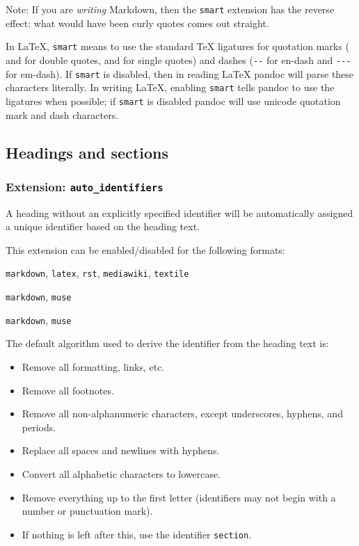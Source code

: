 \documentclass[
]{article}
\providecommand{\tightlist}{%
  \setlength{\itemsep}{0pt}\setlength{\parskip}{0pt}}
\begin{document}
Note: If you are \emph{writing} Markdown, then the \texttt{smart}
extension has the reverse effect: what would have been curly quotes
comes out straight.

In LaTeX, \texttt{smart} means to use the standard TeX ligatures for
quotation marks (\texttt{\textasciigrave{}\textasciigrave{}} and
\texttt{\textquotesingle{}\textquotesingle{}} for double quotes,
\texttt{\textasciigrave{}} and \texttt{\textquotesingle{}} for single
quotes) and dashes (\texttt{-\/-} for en-dash and \texttt{-\/-\/-} for
em-dash). If \texttt{smart} is disabled, then in reading LaTeX pandoc
will parse these characters literally. In writing LaTeX, enabling
\texttt{smart} tells pandoc to use the ligatures when possible; if
\texttt{smart} is disabled pandoc will use unicode quotation mark and
dash characters.

\hypertarget{headings-and-sections}{%
\subsection{Headings and sections}\label{headings-and-sections}}

\hypertarget{extension-auto_identifiers}{%
\subsubsection{\texorpdfstring{Extension:
\texttt{auto\_identifiers}}{Extension: auto\_identifiers}}\label{extension-auto_identifiers}}

A heading without an explicitly specified identifier will be
automatically assigned a unique identifier based on the heading text.

This extension can be enabled/disabled for the following formats:

\begin{description}
\tightlist
\item[input formats]
\texttt{markdown}, \texttt{latex}, \texttt{rst}, \texttt{mediawiki},
\texttt{textile}
\item[output formats]
\texttt{markdown}, \texttt{muse}
\item[enabled by default in]
\texttt{markdown}, \texttt{muse}
\end{description}

The default algorithm used to derive the identifier from the heading
text is:

\begin{itemize}
\tightlist
\item
  Remove all formatting, links, etc.
\item
  Remove all footnotes.
\item
  Remove all non-alphanumeric characters, except underscores, hyphens,
  and periods.
\item
  Replace all spaces and newlines with hyphens.
\item
  Convert all alphabetic characters to lowercase.
\item
  Remove everything up to the first letter (identifiers may not begin
  with a number or punctuation mark).
\item
  If nothing is left after this, use the identifier \texttt{section}.
\end{itemize}
\end{document}
